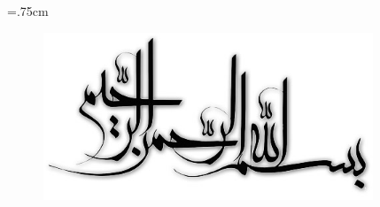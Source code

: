 \documentclass[oneside,msc]{AUTthesis}
\begin{document}
\baselineskip=.75cm

\vspace*{7cm}
\thispagestyle{empty}
\begin{center}
\includegraphics[height=5cm,width=12cm]{images/in-the-name-of-god}
\end{center}
% 
% 
% 

% 


\pagestyle{style1}





\chapterfont{\vspace*{-2em}\centering\LARGE}%

\appendix


% 
\parindent=0pt
%
% 
\pagestyle{style7}
\printindex
\pagestyle{style7}
% 

\end{document}
